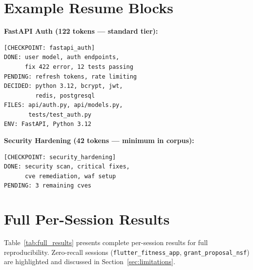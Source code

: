 \documentclass[journal]{IEEEtran}
\begin{document}
\section{Example Resume Blocks}
\label{appendix:resume}

\textbf{FastAPI Auth (122 tokens --- standard tier):}
\begin{small}
\begin{verbatim}
[CHECKPOINT: fastapi_auth]
DONE: user model, auth endpoints,
      fix 422 error, 12 tests passing
PENDING: refresh tokens, rate limiting
DECIDED: python 3.12, bcrypt, jwt,
         redis, postgresql
FILES: api/auth.py, api/models.py,
       tests/test_auth.py
ENV: FastAPI, Python 3.12
\end{verbatim}
\end{small}

\textbf{Security Hardening (42 tokens --- minimum in corpus):}
\begin{small}
\begin{verbatim}
[CHECKPOINT: security_hardening]
DONE: security scan, critical fixes,
      cve remediation, waf setup
PENDING: 3 remaining cves
\end{verbatim}
\end{small}

\section{Full Per-Session Results}
\label{appendix:full}

Table~\ref{tab:full_results} presents complete per-session
results for full reproducibility. Zero-recall sessions
(\texttt{flutter\_fitness\_app}, \texttt{grant\_proposal\_nsf})
are highlighted and discussed in Section~\ref{sec:limitations}.
\end{document}
